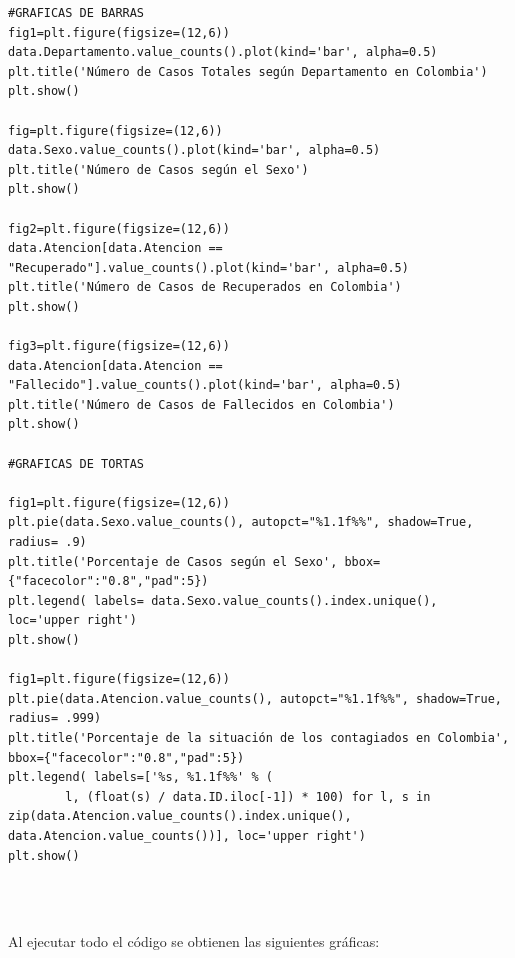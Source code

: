 \documentclass[conference,compsoc,onecolumn]{IEEEtran}
\begin{document}
\begin{lstlisting}
#GRAFICAS DE BARRAS
fig1=plt.figure(figsize=(12,6))
data.Departamento.value_counts().plot(kind='bar', alpha=0.5)
plt.title('Número de Casos Totales según Departamento en Colombia')
plt.show()

fig=plt.figure(figsize=(12,6))
data.Sexo.value_counts().plot(kind='bar', alpha=0.5)
plt.title('Número de Casos según el Sexo')
plt.show()

fig2=plt.figure(figsize=(12,6))
data.Atencion[data.Atencion == "Recuperado"].value_counts().plot(kind='bar', alpha=0.5)
plt.title('Número de Casos de Recuperados en Colombia')
plt.show()

fig3=plt.figure(figsize=(12,6))
data.Atencion[data.Atencion == "Fallecido"].value_counts().plot(kind='bar', alpha=0.5)
plt.title('Número de Casos de Fallecidos en Colombia')
plt.show()

#GRAFICAS DE TORTAS

fig1=plt.figure(figsize=(12,6))
plt.pie(data.Sexo.value_counts(), autopct="%1.1f%%", shadow=True, radius= .9)
plt.title('Porcentaje de Casos según el Sexo', bbox={"facecolor":"0.8","pad":5})
plt.legend( labels= data.Sexo.value_counts().index.unique(), loc='upper right')
plt.show()

fig1=plt.figure(figsize=(12,6))
plt.pie(data.Atencion.value_counts(), autopct="%1.1f%%", shadow=True, radius= .999)
plt.title('Porcentaje de la situación de los contagiados en Colombia', bbox={"facecolor":"0.8","pad":5})
plt.legend( labels=['%s, %1.1f%%' % (
        l, (float(s) / data.ID.iloc[-1]) * 100) for l, s in zip(data.Atencion.value_counts().index.unique(), data.Atencion.value_counts())], loc='upper right')
plt.show()
\end{lstlisting}
\\\

Al ejecutar todo el código se obtienen las siguientes gráficas:
\\\

\begin{figure}[htbp]
\centering
{}
\end{figure}
\end{document}
